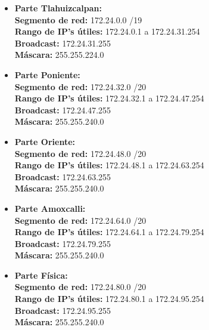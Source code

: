 \begin{itemize}[leftmargin=*]
    \item \textbf{Parte Tlahuizcalpan:} \\
    \textbf{Segmento de red:} 172.24.0.0 /19 \\
    \textbf{Rango de IP's útiles:} 172.24.0.1 a 172.24.31.254 \\
    \textbf{Broadcast:} 172.24.31.255 \\
    \textbf{Máscara:} 255.255.224.0 
    \vspace{5pt}

    \item \textbf{Parte Poniente:} \\
    \textbf{Segmento de red:} 172.24.32.0 /20 \\
    \textbf{Rango de IP's útiles:} 172.24.32.1 a 172.24.47.254 \\
    \textbf{Broadcast:} 172.24.47.255 \\
    \textbf{Máscara:} 255.255.240.0 
    \vspace{5pt}

    \item \textbf{Parte Oriente:} \\
    \textbf{Segmento de red:} 172.24.48.0 /20 \\
    \textbf{Rango de IP's útiles:} 172.24.48.1 a 172.24.63.254 \\
    \textbf{Broadcast:} 172.24.63.255 \\
    \textbf{Máscara:} 255.255.240.0 
    \vspace{5pt}

    \item \textbf{Parte Amoxcalli:} \\
    \textbf{Segmento de red:} 172.24.64.0 /20 \\
    \textbf{Rango de IP's útiles:} 172.24.64.1 a 172.24.79.254 \\
    \textbf{Broadcast:} 172.24.79.255 \\
    \textbf{Máscara:} 255.255.240.0 
    \vspace{5pt}

    \item \textbf{Parte Física:} \\
    \textbf{Segmento de red:} 172.24.80.0 /20 \\
    \textbf{Rango de IP's útiles:} 172.24.80.1 a 172.24.95.254 \\
    \textbf{Broadcast:} 172.24.95.255 \\
    \textbf{Máscara:} 255.255.240.0 
    \vspace{5pt}


\end{itemize}
